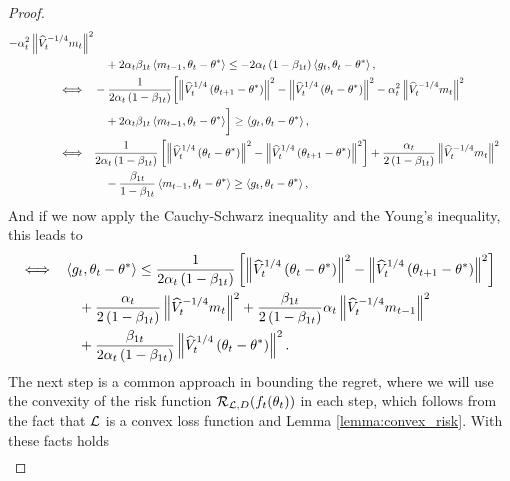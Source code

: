 \begin{proof}
\begin{align*}
- \alpha_t^2 \left\| \widehat{V}_t^{-1/4} m_t \right\|^2\nonumber\\
&\quad + 2\alpha_t\beta_{1t} \left\langle m_{t-1}, \theta_t - \theta^{\ast} \right\rangle \leq - 2\alpha_t\left(1-\beta_{1t}\right) \left\langle g_t, \theta_t - \theta^{\ast} \right\rangle,\nonumber\\
\Longleftrightarrow \quad &-\frac{1}{2\alpha_t\left(1-\beta_{1t}\right)} \biggl[\left\| \widehat{V}_t^{1/4}\left(\theta_{t+1} - \theta^{\ast} \right) \right\|^2 - \left\| \widehat{V}_t^{1/4} \left( \theta_t - \theta^{\ast} \right) \right\|^2  - \alpha_t^2 \left\| \widehat{V}_t^{-1/4} m_t \right\|^2\nonumber\\
&\quad + 2\alpha_t\beta_{1t} \left\langle m_{t-1}, \theta_t - \theta^{\ast} \right\rangle\biggr]\geq \left\langle g_t, \theta_t - \theta^{\ast} \right\rangle,\nonumber\\
\Longleftrightarrow \quad &\frac{1}{2\alpha_t\left(1-\beta_{1t}\right)} \left[\left\| \widehat{V}_t^{1/4} \left( \theta_t - \theta^{\ast} \right) \right\|^2 - \left\| \widehat{V}_t^{1/4}\left(\theta_{t+1} - \theta^{\ast} \right) \right\|^2 \right] +\frac{\alpha_t}{2\left(1-\beta_{1t}\right)} \left\| \widehat{V}_t^{-1/4} m_t \right\|^2\nonumber\\
&\quad -\frac{\beta_{1t}}{1-\beta_{1t}} \left\langle m_{t-1}, \theta_t - \theta^{\ast} \right\rangle\geq \left\langle g_t, \theta_t - \theta^{\ast} \right\rangle,\nonumber\\
\end{align*}
And if we now apply the Cauchy-Schwarz inequality and the Young's inequality, this leads to
\begin{align}\label{eq:1.9}
\Longleftrightarrow \quad &\left\langle g_t, \theta_t - \theta^{\ast} \right\rangle \leq\frac{1}{2\alpha_t\left(1-\beta_{1t}\right)} \left[\left\| \widehat{V}_t^{1/4} \left( \theta_t - \theta^{\ast} \right) \right\|^2 - \left\| \widehat{V}_t^{1/4}\left(\theta_{t+1} - \theta^{\ast} \right) \right\|^2 \right] \nonumber\\
&\quad +\frac{\alpha_t}{2\left(1-\beta_{1t}\right)} \left\| \widehat{V}_t^{-1/4} m_t \right\|^2 + \frac{\beta_{1t}}{2\left(1-\beta_{1t}\right)} \alpha_t \left\| \widehat{V}_t^{-1/4} m_{t-1}\right\|^2\nonumber\\
&\quad + \frac{\beta_{1t}}{2\alpha_t \left( 1-\beta_{1t} \right)} \left\| \widehat{V}_t^{1/4}\left(\theta_t -\theta^{\ast} \right) \right\|^2.
\end{align}
The next step is a common approach in bounding the regret, where we will use the convexity of the risk function $\operatorname{\mathcal{R}}_{\operatorname{\mathcal{L}}, D}(f_t(\theta_t))$ in each step, which follows from the fact that $\operatorname{\mathcal{L}}$ is a convex loss function and Lemma \ref{lemma:convex_risk}. With these facts holds
\begin{align*}

\end{align*}
\end{proof}
